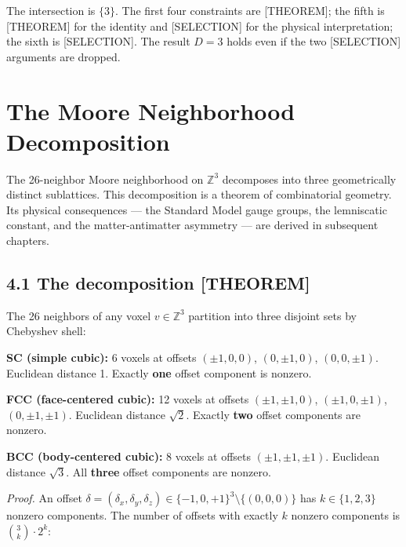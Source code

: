 \documentclass[
  11pt,
  letterpaper,
  twoside,
  openright]{book}
\begin{document}
The intersection is \(\{3\}\). The first four constraints are
{[}THEOREM{]}; the fifth is {[}THEOREM{]} for the identity and
{[}SELECTION{]} for the physical interpretation; the sixth is
{[}SELECTION{]}. The result \(D = 3\) holds even if the two
{[}SELECTION{]} arguments are dropped.

\chapter{The Moore Neighborhood Decomposition}\label{sec-moore}

The 26-neighbor Moore neighborhood on \(\mathbb{Z}^3\) decomposes into
three geometrically distinct sublattices. This decomposition is a
theorem of combinatorial geometry. Its physical consequences --- the
Standard Model gauge groups, the lemniscatic constant, and the
matter-antimatter asymmetry --- are derived in subsequent chapters.

\section{4.1 The decomposition
{[}THEOREM{]}}\label{the-decomposition-theorem}

\begin{ftdtheorem}

The 26 neighbors of any voxel \(v \in \mathbb{Z}^3\) partition into
three disjoint sets by Chebyshev shell:

\textbf{SC (simple cubic):} 6 voxels at offsets \((\pm 1, 0, 0)\),
\((0, \pm 1, 0)\), \((0, 0, \pm 1)\). Euclidean distance 1. Exactly
\textbf{one} offset component is nonzero.

\textbf{FCC (face-centered cubic):} 12 voxels at offsets
\((\pm 1, \pm 1, 0)\), \((\pm 1, 0, \pm 1)\), \((0, \pm 1, \pm 1)\).
Euclidean distance \(\sqrt{2}\). Exactly \textbf{two} offset components
are nonzero.

\textbf{BCC (body-centered cubic):} 8 voxels at offsets
\((\pm 1, \pm 1, \pm 1)\). Euclidean distance \(\sqrt{3}\). All
\textbf{three} offset components are nonzero.

\end{ftdtheorem}

\emph{Proof.} An offset
\(\delta = (\delta_x, \delta_y, \delta_z) \in \{-1, 0, +1\}^3 \setminus \{(0,0,0)\}\)
has \(k \in \{1, 2, 3\}\) nonzero components. The number of offsets with
exactly \(k\) nonzero components is \(\binom{3}{k} \cdot 2^k\):
\end{document}
